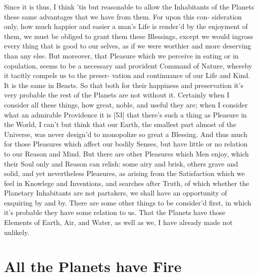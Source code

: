 \documentclass[letterpaper]{book}
\begin{document}
Since it is thus, I think 'tis but reasonable to allow the Inhabitants of
the Planets these same advantages that we have from them. For upon this con-
sideration only, how much happier and easier a man's Life is render'd by the
enjoyment of them, we must be obliged to grant them these Blessings, except
we would ingross every thing that is good to our selves, as if we were
worthier and more deserving than any else. But moreover, that Pleasure which
we perceive in eating or in copulation, seems to be a necessary and
provident Command of Nature, whereby it tacitly compels us to the preser-
vation and continuance of our Life and Kind. It is the same in Beasts. So
that both for their happiness and preservation it's very probable the rest
of the Planets are not without it. Certainly when I consider all these
things, how great, noble, and useful they are; when I consider what an
admirable Providence it is [53] that there's such a thing as Pleasure in the
World, I can't but think that our Earth, the smallest part almost of the
Universe, was never design'd to monopolize so great a Blessing. And thus
much for those Pleasures which affect our bodily Senses, but have little or
no relation to our Reason and Mind. But there are other Pleasures which Men
enjoy, which their Soul only and Reason can relish: some airy and brisk,
others grave and solid, and yet nevertheless Pleasures, as arising from the
Satisfaction which we feel in Knowlege and Inventions, and searches after
Truth, of which whether the Planetary Inhabitants are not partakers, we
shall have an opportunity of enquiring by and by.  There are some other
things to be consider'd first, in which it's probable they have some
relation to us. That the Planets have those Elements of Earth, Air, and
Water, as well as we, I have already made not unlikely.


\section{All the Planets have Fire}
\end{document}

